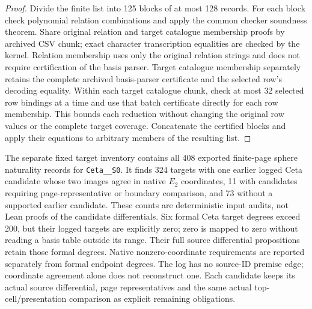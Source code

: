 \begin{proof}
  \leanok
  Divide the finite list into 125 blocks of at most 128 records. For each
  block check polynomial relation combinations and apply the common checker
  soundness theorem. Share original relation and target catalogue membership
  proofs by archived CSV chunk; exact character transcription equalities
  are checked by the kernel. Relation membership uses only the original
  relation strings and does not require certification of the basis parser.
  Target catalogue membership separately retains the complete archived
  basis-parser certificate and the selected row's decoding equality.
  Within each target catalogue chunk, check at
  most 32 selected row bindings at a time and use that batch certificate
  directly for each row membership. This bounds each reduction without
  changing the original row values or the complete target coverage.
  Concatenate the certified blocks and apply their equations to arbitrary
  members of the resulting list.
\end{proof}

The separate fixed target inventory contains all 408 exported finite-page
sphere naturality records for \texttt{Ceta\_\_S0}. It finds 324 targets
with one earlier logged Ceta candidate whose two images agree in native
$E_2$ coordinates, 11 with candidates requiring page-representative or
boundary comparison, and 73 without a supported earlier candidate.
These counts are deterministic input audits, not Lean proofs of the
candidate differentials. Six formal Ceta target degrees exceed 200, but their logged targets
are explicitly zero; zero is mapped to zero without reading a basis table
outside its range. Their full source differential propositions retain those
formal degrees. Native nonzero-coordinate requirements are reported separately
from formal endpoint degrees. The log has no source-ID premise edge;
coordinate agreement alone does not reconstruct one. Each candidate keeps
its actual source differential, page representatives and the same actual
top-cell/presentation comparison as explicit remaining obligations.

